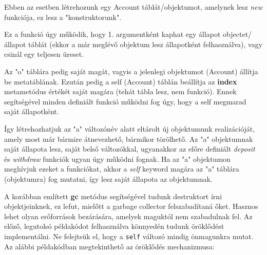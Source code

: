 Ebben az esetben létrehozunk egy Account táblát/objektumot, amelynek lesz \textit{new} funkciója, ez lesz a "konstruktorunk".

Ez a funkció úgy működik, hogy 1. argumentként kaphat egy állapot objectet/állapot táblát (ekkor a már meglévő objektum lesz állapotként felhasználva), vagy csinál egy teljesen üreset.

Az "o" táblára pedig saját magát, vagyis a jelenlegi objektumot (Account) állítja be metatáblának. Ezután pedig a self (Account) táblán beállítja az \detokenize{__}\textbf{index} metametódus értékét saját magára (tehát tábla lesz, nem funkció). Ennek segítségével minden definiált funkció működni fog úgy, hogy a self megmarad saját állapotként.

Így létrehozhatjuk az "a" változónév alatt eltárolt új objektumunk realizációját, amely most már bármire átnevezhető, bármikor törölhető. Az "a" objektumnak saját állapota lesz, saját belső változókkal, ugyanakkor az előre definiált \textit{deposit} és \textit{withdraw} funkciók ugyan úgy működni fognak. Ha az "a" objektumon meghívjuk ezeket a funkciókat, akkor a \textit{self} keyword magára az "a" táblára (objektumra) fog mutatni, így lesz saját állapota az objektumnak.

A korábban említett \detokenize{__}\textbf{gc} metódus segítségével tudunk destruktort írni objektjeinknek, ez lefut, mielőtt a garbage collector felszabadítaná őket. Hasznos lehet olyan erőforrások bezárására, amelyek maguktól nem szabadulnak fel.
\pagebreak
{}
Az előző, legutolsó példakódot felhasználva könnyedén tudunk öröklődést implementálni. Ne felejtsük el, hogy a \texttt{self} változó mindig önmagunkra mutat. Az alábbi példakódban megtekinthető az öröklődés mechanizmusa:

